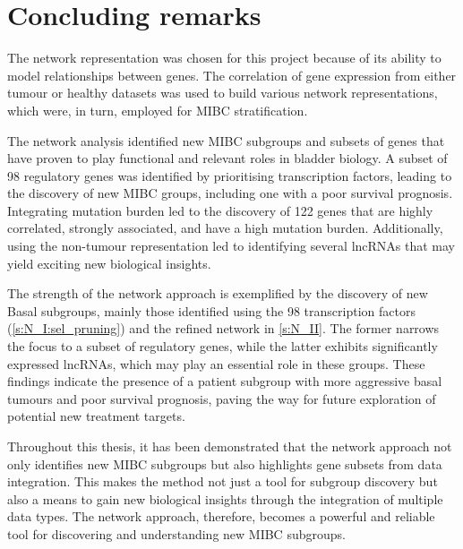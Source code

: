 \section{Concluding remarks}

The network representation was chosen for this project because of its ability to model relationships between genes. The correlation of gene expression from either tumour or healthy datasets was used to build various network representations, which were, in turn, employed for MIBC stratification.


The network analysis identified new MIBC subgroups and subsets of genes that have proven to play functional and relevant roles in bladder biology. A subset of 98 regulatory genes was identified by prioritising transcription factors, leading to the discovery of new MIBC groups, including one with a poor survival prognosis. Integrating mutation burden led to the discovery of 122 genes that are highly correlated, strongly associated, and have a high mutation burden. Additionally, using the non-tumour representation led to identifying several lncRNAs that may yield exciting new biological insights.

% 
The strength of the network approach is exemplified by the discovery of new Basal subgroups, mainly those identified using the 98 transcription factors (\cref{s:N_I:sel_pruning}) and the refined network in \cref{s:N_II}. The former narrows the focus to a subset of regulatory genes, while the latter exhibits significantly expressed lncRNAs, which may play an essential role in these groups. These findings indicate the presence of a patient subgroup with more aggressive basal tumours and poor survival prognosis, paving the way for future exploration of potential new treatment targets.

Throughout this thesis, it has been demonstrated that the network approach not only identifies new MIBC subgroups but also highlights gene subsets from data integration. This makes the method not just a tool for subgroup discovery but also a means to gain new biological insights through the integration of multiple data types. The network approach, therefore, becomes a powerful and reliable tool for discovering and understanding new MIBC subgroups.